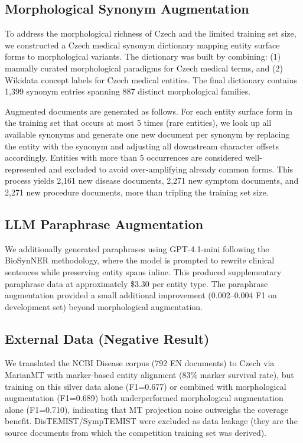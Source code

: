 \documentclass[11pt]{article}
\begin{document}
\subsection{Morphological Synonym Augmentation}

To address the morphological richness of Czech and the limited training set size, we
constructed a Czech medical synonym dictionary mapping entity surface forms to
morphological variants. The dictionary was built by combining:
(1) manually curated morphological paradigms for Czech medical terms,
and (2) Wikidata concept labels for Czech medical entities.
The final dictionary contains 1,399 synonym entries spanning 887 distinct morphological
families.

Augmented documents are generated as follows. For each entity surface form in the training
set that occurs at most 5 times (rare entities), we look up all available synonyms and
generate one new document per synonym by replacing the entity with the synonym and
adjusting all downstream character offsets accordingly. Entities with
more than 5 occurrences are considered well-represented and excluded to avoid over-amplifying
already common forms. This process yields 2,161 new disease documents, 2,271 new symptom
documents, and 2,271 new procedure documents, more than tripling the training set size.

\subsection{LLM Paraphrase Augmentation}

We additionally generated paraphrases using GPT-4.1-mini following the BioSynNER
methodology, where the model is prompted to rewrite clinical sentences while preserving
entity spans inline. This produced supplementary paraphrase data at approximately \$3.30
per entity type. The paraphrase augmentation provided a small additional improvement
(0.002--0.004 F1 on development set) beyond morphological augmentation.

\subsection{External Data (Negative Result)}

We translated the NCBI Disease corpus (792 EN documents) to Czech via MarianMT with
marker-based entity alignment (83\% marker survival rate), but training on this silver
data alone (F1=0.677) or combined with morphological augmentation (F1=0.689) both
underperformed morphological augmentation alone (F1=0.710), indicating that MT
projection noise outweighs the coverage benefit.
DisTEMIST/SympTEMIST were excluded as data leakage (they are the source documents from
which the competition training set was derived).
\end{document}
